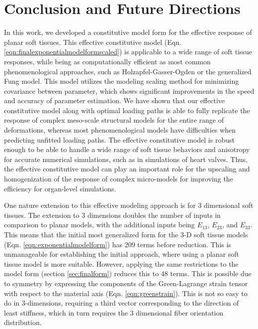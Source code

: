 \section{Conclusion and Future Directions} 

	In this work, we developed a constitutive model form for the effective response of planar soft tissues. This effective constitutive model (Eqn. \ref{eqn:finalexponentialmodelformscaled}) is applicable to a wide range of soft tissue responses, while being as computationally efficient as most common phenomenological approaches, such as Holzapfel-Gasser-Ogden or the generalized Fung model. This model utilizes the modeling scaling method for minimizing covariance between parameter, which shows significant improvements in the speed and accuracy of parameter estimation. We have shown that our effective constitutive model along with optimal loading paths is able to fully replicate the response of complex meso-scale structural models for the entire range of deformations, whereas most phenomenological models have difficulties when predicting unfitted loading paths. The effective constitutive model is robust enough to be able to handle a wide range of soft tissue behaviors and anisotropy for accurate numerical simulations, such as in simulations of heart valves. Thus, the effective constitutive model can play an important role for the upscaling and homogenization of the response of complex micro-models for improving the efficiency for organ-level simulations. 
    

	One nature extension to this effective modeling approach is for 3 dimensional soft tissues. The extension to 3 dimensions doubles the number of inputs in comparison to planar models, with the additional inputs being $E_{13}$, $E_{23}$, and $E_{33}$. This means that the initial most generalized form for the 3-D soft tissue models (Eqn. \ref{eqn:exponentialmodelform}) has 209 terms before reduction. This is unmanageable for establishing the initial approach, where using a planar soft tissue model is more suitable. However, applying the same restrictions to the model form (section \ref{sec:finalform}) reduces this to 48 terms. This is possible due to symmetry by expressing the components of the Green-Lagrange strain tensor with respect to the material axis (Eqn. \ref{eqn:greenstrain}). This is not so easy to do in 3-dimensions, requiring a third vector corresponding to the direction of least stiffness, which in turn requires the 3 dimensional fiber orientation distribution. 
    
    
    
    
    
    
    
    
